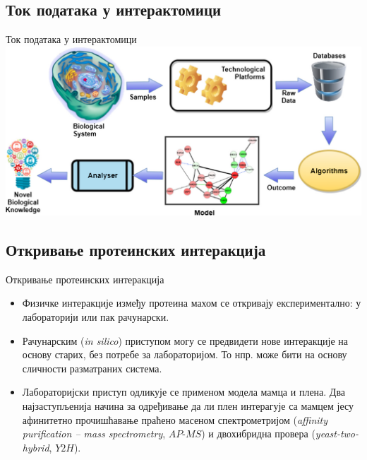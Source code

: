 \documentclass[hyperref={bookmarks=false}]{beamer}
\begin{document}
\subsection{Ток података у интерактомици}
\begin{frame}{Ток података у интерактомици}
\centering\includegraphics[width=.95\textwidth]{tok.png}
\end{frame}

\subsection{Откривање протеинских интеракција}
\begin{frame}{Откривање протеинских интеракција}
\begin{itemize}
	\item Физичке интеракције између протеина махом се откривају експериментално: у лабораторији или пак рачунарски.

	\item Рачунарским (\textit{in silico}) приступом могу се предвидети нове интеракције на основу старих, без потребе за лабораторијом. То нпр. може бити на основу сличности разматраних система.

	\item Лабораторијски приступ одликује се применом модела мамца и плена. Два најзаступљенија начина за одређивање да ли плен интерагује са мамцем јесу афинитетно прочишћавање праћено масеном спектрометријом (\textit{affinity purification -- mass spectrometry}, $AP$-$MS$) и двохибридна провера (\textit{yeast-two-hybrid}, $Y2H$).
\end{itemize}
\end{frame}
\end{document}
